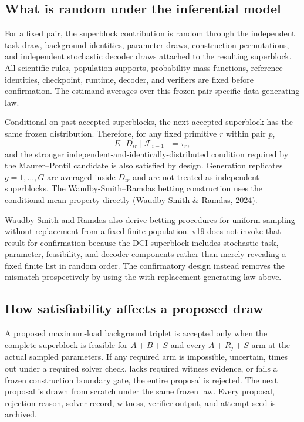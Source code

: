 \documentclass[11pt,a4paper]{article}
\begin{document}
\subsection{What is random under the inferential model}
For a fixed pair, the superblock contribution is random through the independent task draw, background identities, parameter draws, construction permutations, and independent stochastic decoder draws attached to the resulting superblock. All scientific rules, population supports, probability mass functions, reference identities, checkpoint, runtime, decoder, and verifiers are fixed before confirmation. The estimand averages over this frozen pair-specific data-generating law.

Conditional on past accepted superblocks, the next accepted superblock has the same frozen distribution. Therefore, for any fixed primitive $r$ within pair $p$,
\[
E[D_{ir}\mid\mathcal F_{i-1}]=\tau_r,
\]
and the stronger independent-and-identically-distributed condition required by the Maurer--Pontil candidate is also satisfied by design. Generation replicates $g=1,\ldots,G$ are averaged inside $D_{ir}$ and are not treated as independent superblocks. The Waudby-Smith--Ramdas betting construction uses the conditional-mean property directly \href{https://doi.org/10.1093/jrsssb/qkad009}{(Waudby-Smith \& Ramdas, 2024)}.

Waudby-Smith and Ramdas also derive betting procedures for uniform sampling without replacement from a fixed finite population. v19 does not invoke that result for confirmation because the DCI superblock includes stochastic task, parameter, feasibility, and decoder components rather than merely revealing a fixed finite list in random order. The confirmatory design instead removes the mismatch prospectively by using the with-replacement generating law above.

\subsection{How satisfiability affects a proposed draw}
A proposed maximum-load background triplet is accepted only when the complete superblock is feasible for $A+B+S$ and every $A+R_j+S$ arm at the actual sampled parameters. If any required arm is impossible, uncertain, times out under a required solver check, lacks required witness evidence, or fails a frozen construction boundary gate, the entire proposal is rejected. The next proposal is drawn from scratch under the same frozen law. Every proposal, rejection reason, solver record, witness, verifier output, and attempt seed is archived.
\end{document}

